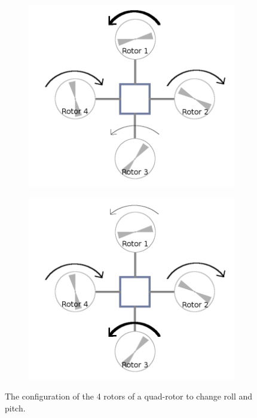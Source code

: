 \documentclass[hidelinks,BTech]{iitmdiss}
\begin{document}
\begin{figure}[H]
  \centering
    \begin{subfigure}[c]{0.45\textwidth}
      \centering
        \includegraphics[width=\textwidth]{quadrotor_rotors_roll.png}
        \caption{}
    \end{subfigure}
    \begin{subfigure}[c]{0.45\textwidth}
      \centering
        \includegraphics[width=\textwidth]{quadrotor_rotors_pitch.png}
        \caption{}
    \end{subfigure}
    \caption{The configuration of the 4 rotors of a quad-rotor to change roll and pitch.}
\end{figure}
\end{document}
